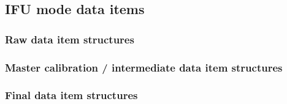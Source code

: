 \subsection{IFU mode data items}\label{ssec:lms_drl_items_structures}
\subsubsection{Raw data item structures}\label{sssec:lmsrawdatastructs}
\subsubsection{Master calibration / intermediate data item structures}\label{sssec:lmsprocdatastructs}
\subsubsection{Final data item structures}\label{sssec:lmsfinaldatastructs}